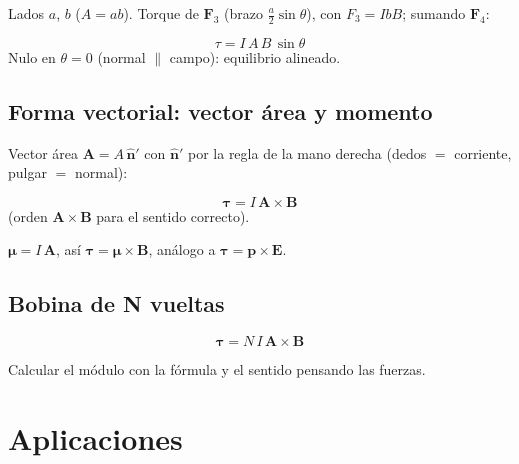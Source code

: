 \documentclass[12pt,a4paper]{article}
\begin{document}
Lados $a$, $b$ ($A=ab$). Torque de $\mathbf{F}_3$ (brazo
$\tfrac{a}{2}\sin\theta$), con $F_3 = IbB$; sumando $\mathbf{F}_4$:

\begin{keybox}
  \[
  \boxed{\tau = I\,A\,B\,\sin\theta}
  \]
  Nulo en $\theta=0$ (normal $\parallel$ campo): equilibrio alineado.
\end{keybox}



\subsection{Forma vectorial: vector área y momento}

Vector área $\mathbf{A} = A\,\hat{\mathbf{n}}'$ con $\hat{\mathbf{n}}'$
por la regla de la mano derecha (dedos $=$ corriente, pulgar $=$ normal):

\begin{keybox}
  \[
  \boxed{\boldsymbol{\tau} = I\,\mathbf{A}\times\mathbf{B}}
  \]
  (orden $\mathbf{A}\times\mathbf{B}$ para el sentido correcto).
\end{keybox}

\begin{notebox}
  $\boldsymbol{\mu} = I\,\mathbf{A}$, así $\boldsymbol{\tau} =
  \boldsymbol{\mu}\times\mathbf{B}$, análogo a $\boldsymbol{\tau} =
  \mathbf{p}\times\mathbf{E}$.
\end{notebox}



\subsection{Bobina de N vueltas}

\[
\boxed{\boldsymbol{\tau} = N\,I\,\mathbf{A}\times\mathbf{B}}
\]

\begin{notebox}[Consejo]
  Calcular el módulo con la fórmula y el sentido pensando las fuerzas.
\end{notebox}

\section{Aplicaciones}
\end{document}
